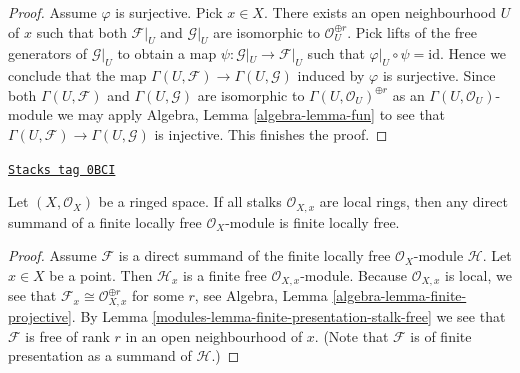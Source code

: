\begin{proof}
Assume $\varphi$ is surjective. Pick $x \in X$.
There exists an open neighbourhood $U$ of $x$
such that both $\mathcal{F}|_U$ and $\mathcal{G}|_U$ are
isomorphic to $\mathcal{O}_U^{\oplus r}$.
Pick lifts of the free generators of $\mathcal{G}|_U$
to obtain a map $\psi : \mathcal{G}|_U \to \mathcal{F}|_U$
such that $\varphi|_U \circ \psi = \text{id}$.
Hence we conclude that the map
$\Gamma(U, \mathcal{F}) \to \Gamma(U, \mathcal{G})$
induced by $\varphi$ is surjective. Since both
$\Gamma(U, \mathcal{F})$ and $\Gamma(U, \mathcal{G})$
are isomorphic to $\Gamma(U, \mathcal{O}_U)^{\oplus r}$
as an $\Gamma(U, \mathcal{O}_U)$-module we may
apply Algebra, Lemma \ref{algebra-lemma-fun} to see that
$\Gamma(U, \mathcal{F}) \to \Gamma(U, \mathcal{G})$
is injective. This finishes the proof.
\end{proof}

\begin{lemma}
\label{modules-lemma-direct-summand-of-locally-free-is-locally-free}
\href{https://stacks.math.columbia.edu/tag/0BCI}{\texttt{Stacks tag 0BCI}}

Let $(X, \mathcal{O}_X)$ be a ringed space. If all stalks $\mathcal{O}_{X, x}$
are local rings, then any direct summand of a finite locally free
$\mathcal{O}_X$-module is finite locally free.
\end{lemma}

\begin{proof}

Assume $\mathcal{F}$ is a direct summand of the finite locally free
$\mathcal{O}_X$-module $\mathcal{H}$.
Let $x \in X$ be a point. Then $\mathcal{H}_x$ is a finite free
$\mathcal{O}_{X, x}$-module.
Because $\mathcal{O}_{X, x}$ is local, we see that
$\mathcal{F}_x \cong \mathcal{O}_{X, x}^{\oplus r}$ for some $r$, see
Algebra, Lemma \ref{algebra-lemma-finite-projective}.
By Lemma \ref{modules-lemma-finite-presentation-stalk-free}
we see that $\mathcal{F}$ is free of rank $r$ in an open neighbourhood of $x$.
(Note that $\mathcal{F}$ is of finite presentation as a summand of
$\mathcal{H}$.)
\end{proof}

